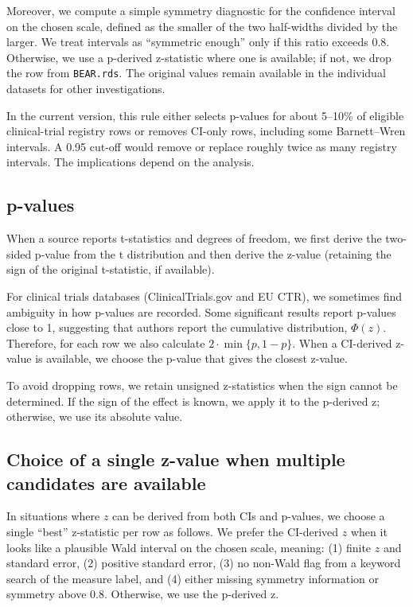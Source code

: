 \documentclass[
  11pt,
]{article}
\begin{document}
Moreover, we compute a simple symmetry diagnostic for the confidence
interval on the chosen scale, defined as the smaller of the two
half-widths divided by the larger. We treat intervals as ``symmetric
enough'' only if this ratio exceeds 0.8. Otherwise, we use a p-derived
z-statistic where one is available; if not, we drop the row from
\texttt{BEAR.rds}. The original values remain available in the
individual datasets for other investigations.

In the current version, this rule either selects p-values for about
5--10\% of eligible clinical-trial registry rows or removes CI-only
rows, including some Barnett--Wren intervals. A 0.95 cut-off would
remove or replace roughly twice as many registry intervals. The
implications depend on the analysis.

\subsection{p-values}\label{p-values}

When a source reports t-statistics and degrees of freedom, we first
derive the two-sided p-value from the t distribution and then derive the
z-value (retaining the sign of the original t-statistic, if available).

For clinical trials databases (ClinicalTrials.gov and EU CTR), we
sometimes find ambiguity in how p-values are recorded. Some significant
results report p-values close to 1, suggesting that authors report the
cumulative distribution, \(\Phi(z)\). Therefore, for each row we also
calculate \(2\cdot\min\{p,1-p\}\). When a CI-derived z-value is
available, we choose the p-value that gives the closest z-value.

To avoid dropping rows, we retain unsigned z-statistics when the sign
cannot be determined. If the sign of the effect is known, we apply it to
the p-derived z; otherwise, we use its absolute value.

\subsection{Choice of a single z-value when multiple candidates are
available}\label{choice-of-a-single-z-value-when-multiple-candidates-are-available}

In situations where \(z\) can be derived from both CIs and p-values, we
choose a single ``best'' z-statistic per row as follows. We prefer the
CI-derived \(z\) when it looks like a plausible Wald interval on the
chosen scale, meaning: (1) finite \(z\) and standard error, (2) positive
standard error, (3) no non-Wald flag from a keyword search of the
measure label, and (4) either missing symmetry information or symmetry
above 0.8. Otherwise, we use the p-derived z.
\end{document}
